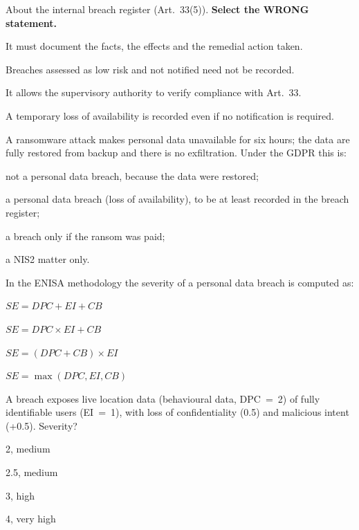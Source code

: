 \begin{domanda}\label{q:registro}
About the internal breach register (Art.~33(5)). \textbf{Select the WRONG statement.}
\begin{opzioni}
  \item It must document the facts, the effects and the remedial action taken.
  \item Breaches assessed as low risk and not notified need not be recorded.
  \item It allows the supervisory authority to verify compliance with Art.~33.
  \item A temporary loss of availability is recorded even if no notification is required.
\end{opzioni}
\end{domanda}

\begin{domanda}\label{q:disponibilita}
A ransomware attack makes personal data unavailable for six hours; the data are fully restored from
backup and there is no exfiltration. Under the GDPR this is:
\begin{opzioni}
  \item not a personal data breach, because the data were restored;
  \item a personal data breach (loss of availability), to be at least recorded in the breach register;
  \item a breach only if the ransom was paid;
  \item a NIS2 matter only.
\end{opzioni}
\end{domanda}

\begin{domanda}\label{q:formula}
In the ENISA methodology the severity of a personal data breach is computed as:
\begin{opzioni}
  \item $SE = DPC + EI + CB$
  \item $SE = DPC \times EI + CB$
  \item $SE = (DPC + CB) \times EI$
  \item $SE = \max(DPC, EI, CB)$
\end{opzioni}
\end{domanda}

\begin{domanda}\label{q:severita}
A breach exposes live location data (behavioural data, DPC~=~2) of fully identifiable users (EI~=~1),
with loss of confidentiality (0.5) and malicious intent (+0.5). Severity?
\begin{opzioni}
  \item 2, medium
  \item 2.5, medium
  \item 3, high
  \item 4, very high
\end{opzioni}
\end{domanda}

